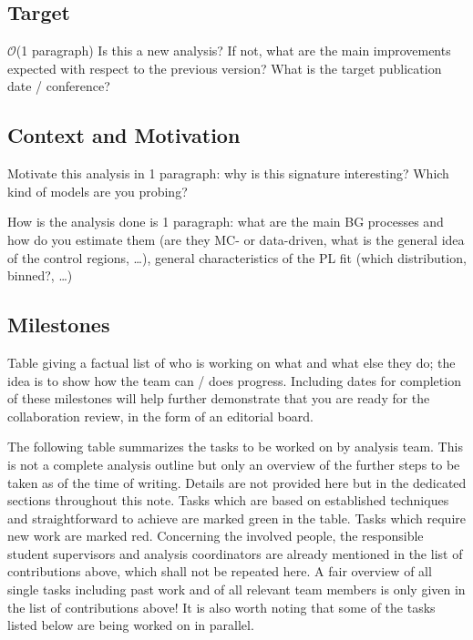 \subsection{Target} 

\(\mathcal{O}\)(1 paragraph)
Is this a new analysis? If not, what are the main improvements expected with respect to the previous version?
What is the target publication date / conference?

\subsection{Context and Motivation} 

Motivate this analysis in 1 paragraph: why is this signature interesting? Which kind of models are you probing?

How is the analysis done is 1 paragraph: what are the main BG processes and how do you estimate them (are they MC- or data-driven,
what is the general idea of the control regions, \ldots), general characteristics of the PL fit (which distribution, binned?, \ldots)

\subsection{Milestones}

 Table giving a factual list of who is working on what and what else they do; the idea is to show how the team can / does progress. 
 Including dates for completion of these milestones will help further demonstrate that you are ready for the collaboration
 review, in the form of an editorial board.

The following table summarizes the tasks to be worked on by analysis team.
This is not a complete analysis outline but only an overview of the further steps to be taken as of the time of writing.
Details are not provided here but in the dedicated sections throughout this note.
Tasks which are based on established techniques and straightforward to achieve are marked green in the table.
Tasks which require new work are marked red.
Concerning the involved people, the responsible student supervisors and analysis coordinators are already mentioned in the list of contributions above,
which shall not be repeated here.
A fair overview of all single tasks including past work and of all relevant team members is only given in the list of contributions above!
It is also worth noting that some of the tasks listed below are being worked on in parallel. 


